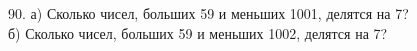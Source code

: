90. а) Сколько чисел, больших 59 и меньших 1001, делятся на 7?\\
б) Сколько чисел, больших 59 и меньших 1002, делятся на 7?\\
